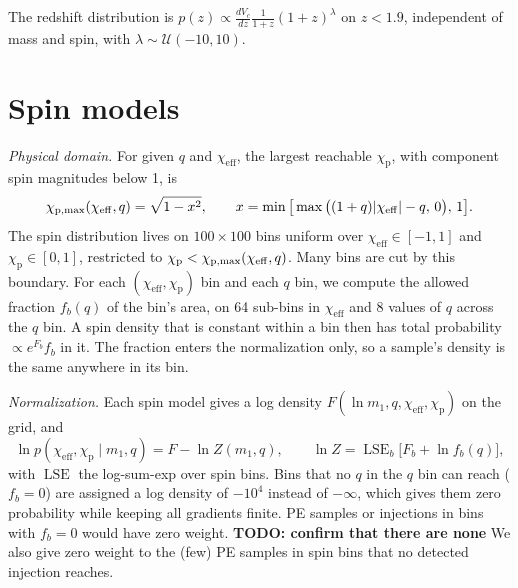 \documentclass[%
 reprint,
 amsmath,amssymb,
 aps,
 prl,
 nofootinbib,nobibnotes,
 floatfix,
]{revtex4-2}
\newcommand{\chieff}{\ensuremath{\chi_{\mathrm{eff}}}}
\newcommand{\chip}{\ensuremath{\chi_{\mathrm{p}}}}
\newcommand{\LSE}{\operatorname{LSE}}
\newcommand{\todo}[1]{{\color{Blue}\bf TODO: #1}}
\begin{document}
The redshift distribution is $p(z) \propto \frac{dV_c}{dz} \frac{1}{1+z} (1 + z)^{\lambda}$ on $z < 1.9$, independent of mass and spin, with $\lambda \sim \mathcal{U}(-10, 10)$.

\section{Spin models}
\label{sm: spin models}

\textit{Physical domain.} For given $q$ and $\chieff$, the largest reachable $\chip$, with component spin magnitudes below 1, is~\cite{iwaya_analytic_2025}
\begin{equation}
    \chi_{\rm p, max}(\chieff, q) = \sqrt{1 - x^2}, \qquad x = \min\big[\max\big((1 + q)|\chieff| - q,\, 0\big),\, 1\big].
\end{equation}
The spin distribution lives on $100 \times 100$ bins uniform over $\chieff \in [-1, 1]$ and $\chip \in [0, 1]$, restricted to $\chip < \chi_{\rm p, max}(\chieff, q)$. Many bins are cut by this boundary. For each $(\chieff, \chip)$ bin and each $q$ bin, we compute the allowed fraction $f_b(q)$ of the bin's area, on 64 sub-bins in $\chieff$ and 8 values of $q$ across the $q$ bin. A spin density that is constant within a bin then has total probability $\propto e^{F_b} f_b$ in it. The fraction enters the normalization only, so a sample's density is the same anywhere in its bin.

\textit{Normalization.} Each spin model gives a log density $F(\ln m_1, q, \chieff, \chip)$ on the grid, and
\begin{equation}
    \ln p(\chieff, \chip \mid m_1, q) = F - \ln Z(m_1, q), \qquad \ln Z = \LSE_{b}\big[F_b + \ln f_b(q)\big],
\end{equation}
with $\LSE$ the log-sum-exp over spin bins. Bins that no $q$ in the $q$ bin can reach ($f_b = 0$) are assigned a log density of $-10^4$ instead of $-\infty$, which gives them zero probability while keeping all gradients finite. \ac{PE} samples or injections in bins with $f_b = 0$ would have zero weight. \todo{confirm that there are none} We also give zero weight to the (few) \ac{PE} samples in spin bins that no detected injection reaches.
\end{document}
